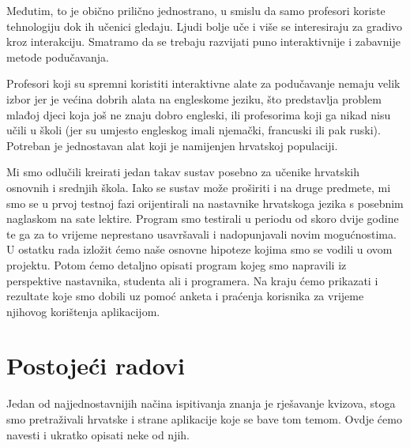 \documentclass{scrreprt}
\begin{document}
Međutim, to je obično prilično jednostrano, u smislu da samo profesori koriste
tehnologiju dok ih učenici gledaju. Ljudi bolje uče i više se interesiraju za
gradivo kroz interakciju. Smatramo da se trebaju razvijati puno interaktivnije i
zabavnije metode podučavanja.

Profesori koji su spremni koristiti interaktivne alate za podučavanje nemaju velik
izbor jer je većina dobrih alata na engleskome jeziku, što predstavlja problem
mlađoj djeci koja još ne znaju dobro engleski, ili profesorima koji ga nikad
nisu učili u školi (jer su umjesto engleskog imali njemački, francuski ili pak
ruski). Potreban je jednostavan alat koji je namijenjen hrvatskoj populaciji.

Mi smo odlučili kreirati jedan takav sustav posebno za učenike hrvatskih
osnovnih i srednjih škola. Iako se sustav može proširiti i na druge predmete,
mi smo se u prvoj testnoj fazi orijentirali na nastavnike hrvatskoga jezika s
posebnim naglaskom na sate lektire. Program smo testirali u periodu od skoro
dvije godine te ga za to vrijeme neprestano usavršavali i nadopunjavali novim
mogućnostima. U ostatku rada izložit ćemo naše osnovne hipoteze kojima smo se
vodili u ovom projektu. Potom ćemo detaljno opisati program kojeg smo napravili
iz perspektive nastavnika, studenta ali i programera. Na kraju ćemo prikazati i
rezultate koje smo dobili uz pomoć anketa i praćenja korisnika za vrijeme
njihovog korištenja aplikacijom.

\section{Postojeći radovi}

Jedan od najjednostavnijih načina ispitivanja znanja je rješavanje kvizova,
stoga smo pretraživali hrvatske i strane aplikacije koje se bave tom temom.
Ovdje ćemo navesti i ukratko opisati neke od njih.
\end{document}
